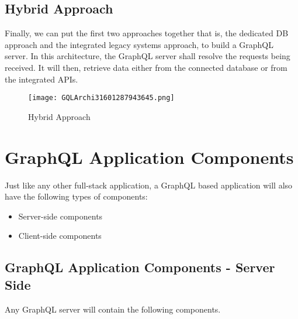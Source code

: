 \documentclass[../main.tex]{subfiles}
\begin{document}
\subsection{Hybrid Approach}
Finally, we can put the first two approaches together that is, the dedicated DB approach and the integrated legacy systems approach, to build a GraphQL server. In this architecture, the GraphQL server shall resolve the requests being received. It will then, retrieve data either from the connected database or from the integrated APIs.

\begin{figure}[h!]
\centerline{\texttt{[image: GQLArchi31601287943645.png]}}
\caption{Hybrid Approach}
\label{fig:Hybrid-Approach}
\end{figure}

\section{GraphQL Application Components}
Just like any other full-stack application, a GraphQL based application will also have the following types of components:
\begin{itemize}
  \item Server-side components
  \item Client-side components
\end{itemize}
\subsection{GraphQL Application Components - Server Side}
Any GraphQL server will contain the following components.
\end{document}
